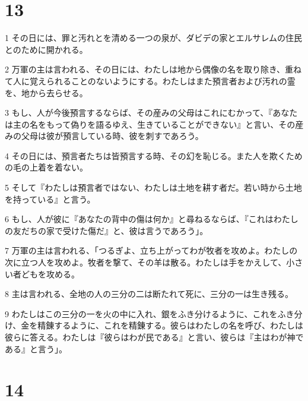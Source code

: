 \chapter{13}

\par 1 その日には、罪と汚れとを清める一つの泉が、ダビデの家とエルサレムの住民とのために開かれる。
\par 2 万軍の主は言われる、その日には、わたしは地から偶像の名を取り除き、重ねて人に覚えられることのないようにする。わたしはまた預言者および汚れの霊を、地から去らせる。
\par 3 もし、人が今後預言するならば、その産みの父母はこれにむかって、『あなたは主の名をもって偽りを語るゆえ、生きていることができない』と言い、その産みの父母は彼が預言している時、彼を刺すであろう。
\par 4 その日には、預言者たちは皆預言する時、その幻を恥じる。また人を欺くための毛の上着を着ない。
\par 5 そして『わたしは預言者ではない、わたしは土地を耕す者だ。若い時から土地を持っている』と言う。
\par 6 もし、人が彼に『あなたの背中の傷は何か』と尋ねるならば、『これはわたしの友だちの家で受けた傷だ』と、彼は言うであろう」。
\par 7 万軍の主は言われる、「つるぎよ、立ち上がってわが牧者を攻めよ。わたしの次に立つ人を攻めよ。牧者を撃て、その羊は散る。わたしは手をかえして、小さい者どもを攻める。
\par 8 主は言われる、全地の人の三分の二は断たれて死に、三分の一は生き残る。
\par 9 わたしはこの三分の一を火の中に入れ、銀をふき分けるように、これをふき分け、金を精錬するように、これを精錬する。彼らはわたしの名を呼び、わたしは彼らに答える。わたしは『彼らはわが民である』と言い、彼らは『主はわが神である』と言う」。

\chapter{14}


